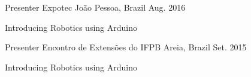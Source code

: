 

\begin{cventries}

  \cventry
    {Presenter} %
    {Expotec} %
    {João Pessoa, Brazil} %
    {Aug. 2016} %
    {
      \begin{cvitems} %
        \item {Introducing Robotics using Arduino}
      \end{cvitems}
    }


  \cventry
    {Presenter} %
    {Encontro de Extensões do IFPB} %
    {Areia, Brazil} %
    {Set. 2015} %
    {
      \begin{cvitems} %
        \item {Introducing Robotics using Arduino}
      \end{cvitems}
    }


\end{cventries}
